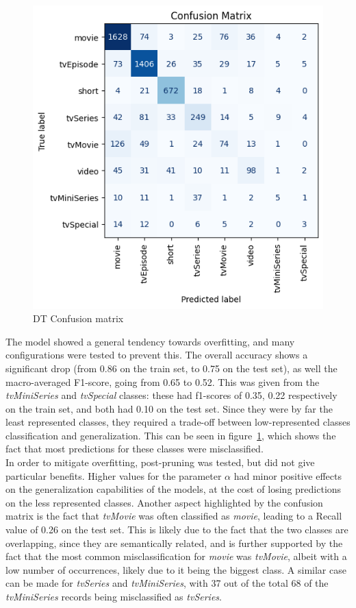 \begin{figure}
    \centering
    \captionsetup{justification=raggedleft, width=1\linewidth}
    \caption{DT Confusion matrix}
    \label{fig:multiclass_dt_conf_matrix}
    \includegraphics[width=0.9\linewidth]{plots/multiclass_dt_conf_matrix.png}
\end{figure}
The model showed a general tendency towards overfitting, and many configurations were tested to prevent
this.
The overall accuracy shows a significant drop (from 0.86 on the train set, to 0.75 on the test set),
as well the macro-averaged F1-score, going from 0.65 to 0.52.
This was given from the \textit{tvMiniSeries} and \textit{tvSpecial} classes: these had f1-scores of
0.35, 0.22 respectively on the train set, and both had 0.10 on the test set. Since they were by far
the least represented classes, they required a trade-off between low-represented classes classification
and generalization. This can be seen in figure~\ref{fig:multiclass_dt_conf_matrix}, which shows the fact
that most predictions for these classes were misclassified.\\
In order to mitigate overfitting, post-pruning was tested, but did not give particular benefits.
Higher values for the parameter $\alpha$ had minor positive effects on the generalization
capabilities of the models, at the cost of losing predictions on the less represented classes.
Another aspect highlighted by the confusion matrix is the fact that \textit{tvMovie} was often
classified as \textit{movie}, leading to a Recall value of 0.26 on the test set.
This is likely due to the fact that the two classes are overlapping, since they are semantically related,
and is further supported by the fact that the most common misclassification for \textit{movie} was
\textit{tvMovie}, albeit with a low number of occurrences, likely due to it being the biggest class.
A similar case can be made for \textit{tvSeries} and \textit{tvMiniSeries}, with 37 out of the total 68
of the \textit{tvMiniSeries} records being misclassified as \textit{tvSeries}.


